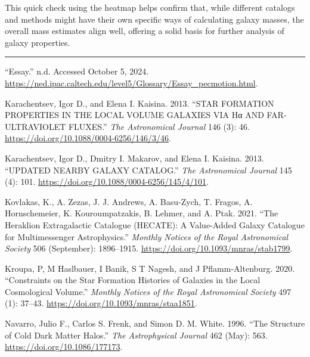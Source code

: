 \documentclass[
]{article}
\newlength{\cslhangindent}
\newenvironment{CSLReferences}[2] %
 {\begin{list}{}{%
  \setlength{\itemindent}{0pt}
  \setlength{\leftmargin}{0pt}
  \setlength{\parsep}{0pt}
  \ifodd #1
   \setlength{\leftmargin}{\cslhangindent}
   \setlength{\itemindent}{-1\cslhangindent}
  \fi
  \setlength{\itemsep}{#2\baselineskip}}}
 {\end{list}}
\begin{document}
This quick check using the heatmap helps confirm that, while different
catalogs and methods might have their own specific ways of calculating
galaxy masses, the overall mass estimates align well, offering a solid
basis for further analysis of galaxy properties.

\begin{center}\rule{0.5\linewidth}{0.5pt}\end{center}

\label{refs}
\begin{CSLReferences}{1}{0}
{``Essay.''} n.d. Accessed October 5, 2024.
\url{https://ned.ipac.caltech.edu/level5/Glossary/Essay_pecmotion.html}.

Karachentsev, Igor D., and Elena I. Kaisina. 2013. {``{STAR FORMATION
PROPERTIES IN THE LOCAL VOLUME GALAXIES VIA Hα AND FAR-ULTRAVIOLET
FLUXES}.''} \emph{The Astronomical Journal} 146 (3): 46.
\url{https://doi.org/10.1088/0004-6256/146/3/46}.

Karachentsev, Igor D., Dmitry I. Makarov, and Elena I. Kaisina. 2013.
{``{UPDATED NEARBY GALAXY CATALOG}.''} \emph{The Astronomical Journal}
145 (4): 101. \url{https://doi.org/10.1088/0004-6256/145/4/101}.

Kovlakas, K., A. Zezas, J. J. Andrews, A. Basu-Zych, T. Fragos, A.
Hornschemeier, K. Kouroumpatzakis, B. Lehmer, and A. Ptak. 2021. {``The
{Heraklion Extragalactic Catalogue} ({HECATE}): A Value-Added Galaxy
Catalogue for Multimessenger Astrophysics.''} \emph{Monthly Notices of
the Royal Astronomical Society} 506 (September): 1896--1915.
\url{https://doi.org/10.1093/mnras/stab1799}.

Kroupa, P, M Haslbauer, I Banik, S T Nagesh, and J Pflamm-Altenburg.
2020. {``Constraints on the Star Formation Histories of Galaxies in the
{Local Cosmological Volume}.''} \emph{Monthly Notices of the Royal
Astronomical Society} 497 (1): 37--43.
\url{https://doi.org/10.1093/mnras/staa1851}.

Navarro, Julio F., Carlos S. Frenk, and Simon D. M. White. 1996. {``The
{Structure} of {Cold Dark Matter Halos}.''} \emph{The Astrophysical
Journal} 462 (May): 563. \url{https://doi.org/10.1086/177173}.

\end{CSLReferences}
\end{document}
